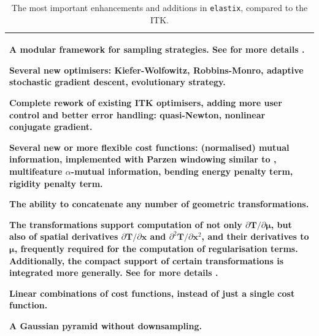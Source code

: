 \documentclass[]{report}
\newcommand{\elastix}{\texttt{elastix}}
\newcommand{\vx}{\bm{x}}
\newcommand{\vmu}{\bm{\mu}}
\newcommand{\vT}{\bm{T}}
\begin{document}
\begin{table}
\centering
\begin{tabular}{p{30pc}}
\toprule \toprule
\begin{list}{}{\leftmargin=1em}
\item A modular framework for sampling strategies. See for more details \cite{StaringKlein2010b}.

\item Several new optimisers: Kiefer-Wolfowitz, Robbins-Monro,
adaptive stochastic gradient descent, evolutionary strategy.

\item Complete rework of existing ITK optimisers, adding more user
control and better error handling: quasi-Newton, nonlinear conjugate
gradient.

\item Several new or more flexible cost functions: (normalised) mutual
information, implemented with Parzen windowing similar to
\cite{ThevenazEA00a}, multifeature $\alpha$-mutual information,
bending energy penalty term, rigidity penalty term.

\item The ability to concatenate any number of geometric
transformations.

\item The transformations support computation of not only $\partial \vT /
    \partial \vmu$, but also of spatial derivatives $\partial \vT / \partial
    \vx$ and $\partial^2 \vT / \partial \vx^2$, and their derivatives to
    $\vmu$, frequently required for the computation of regularisation terms.
    Additionally, the compact support of certain transformations is integrated
    more generally. See for more details \cite{StaringKlein2010a}.

\item Linear combinations of cost functions, instead of just a single cost
function.

\item A Gaussian pyramid without downsampling.
\end{list}\\
 \bottomrule \bottomrule
\end{tabular}
\caption{The most important enhancements and additions in \elastix,
compared to the ITK.}\label{table:extras}
\end{table}


\end{document}
